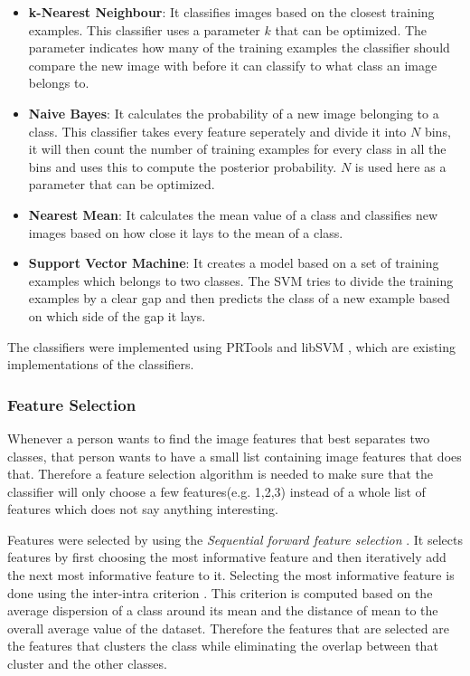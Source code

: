 \begin{itemize}
	\item \textbf{k-Nearest Neighbour}: It classifies images based on the closest training examples.
	This classifier uses a parameter $k$ that can be optimized. 
	The parameter indicates how many of the training examples the classifier should compare the new image with before it can classify to what class an image belongs to.
	\item \textbf{Naive Bayes}: It calculates the probability of a new image belonging to a class.
	This classifier takes every feature seperately and divide it into $N$ bins, it will then count the number of training examples for every class in all the bins and uses this to compute the posterior probability.
	$N$ is used here as a parameter that can be optimized.
	\item \textbf{Nearest Mean}: It calculates the mean value of a class and classifies new images based on how close it lays to the mean of a class.
	\item \textbf{Support Vector Machine}: It creates a model based on a set of training examples which belongs to two classes.
	The SVM tries to divide the training examples by a clear gap and then predicts the class of a new example based on which side of the gap it lays.
\end{itemize}

The classifiers were implemented using PRTools \cite{Duin00prtoolsversion} and libSVM \cite{chang2001libsvm}, which are existing implementations of the classifiers.

\subsubsection{Feature Selection}
Whenever a person wants to find the image features that best separates two classes, that person wants to have a small list containing image features that does that.
Therefore a feature selection algorithm is needed to make sure that the classifier will only choose a few features(e.g. 1,2,3) instead of a whole list of features which does not say anything interesting.

Features were selected by using the \textit{Sequential forward feature selection} \cite{pudil1994floating}.
It selects features by first choosing the most informative feature and then iteratively add the next most informative feature to it.
Selecting the most informative feature is done using the inter-intra criterion \cite{pekalska2005pairwise}.
This criterion is computed based on the average dispersion of a class around its mean and the distance of mean to the overall average value of the dataset.
Therefore the features that are selected are the features that clusters the class while eliminating the overlap between that cluster and the other classes.

